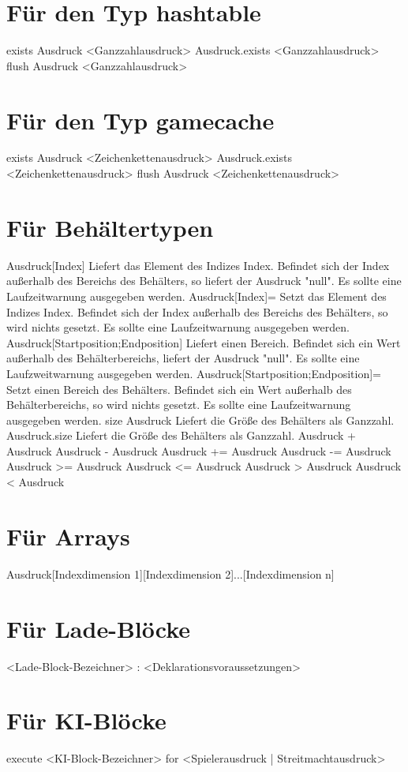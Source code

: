 \section{Für den Typ hashtable}
exists Ausdruck <Ganzzahlausdruck>
Ausdruck.exists <Ganzzahlausdruck>
flush Ausdruck <Ganzzahlausdruck>

\section{Für den Typ gamecache}
exists Ausdruck <Zeichenkettenausdruck>
Ausdruck.exists <Zeichenkettenausdruck>
flush Ausdruck <Zeichenkettenausdruck>

\section{Für Behältertypen}
Ausdruck[Index]					Liefert das Element des Indizes Index. Befindet sich der Index außerhalb des Bereichs des Behälters, so liefert der Ausdruck "null". Es sollte eine Laufzeitwarnung ausgegeben werden.
Ausdruck[Index]=				Setzt das Element des Indizes Index. Befindet sich der Index außerhalb des Bereichs des Behälters, so wird nichts gesetzt. Es sollte eine Laufzeitwarnung ausgegeben werden.
Ausdruck[Startposition;Endposition]		Liefert einen Bereich. Befindet sich ein Wert außerhalb des Behälterbereichs, liefert der Ausdruck "null". Es sollte eine Laufzweitwarnung ausgegeben werden.
Ausdruck[Startposition;Endposition]=		Setzt einen Bereich des Behälters. Befindet sich ein Wert außerhalb des Behälterbereichs, so wird nichts gesetzt. Es sollte eine Laufzeitwarnung ausgegeben werden.
size Ausdruck					Liefert die Größe des Behälters als Ganzzahl.
Ausdruck.size					Liefert die Größe des Behälters als Ganzzahl.
Ausdruck + Ausdruck
Ausdruck - Ausdruck
Ausdruck += Ausdruck
Ausdruck -= Ausdruck
Ausdruck >= Ausdruck
Ausdruck <= Ausdruck
Ausdruck > Ausdruck
Ausdruck < Ausdruck

\section{Für Arrays}
Ausdruck[Indexdimension 1][Indexdimension 2]...[Indexdimension n]

\section{Für Lade-Blöcke}
<Lade-Block-Bezeichner> : <Deklarationsvoraussetzungen>

\section{Für KI-Blöcke}
execute <KI-Block-Bezeichner> for <Spielerausdruck | Streitmachtausdruck>

